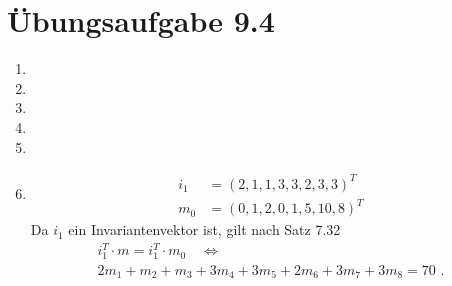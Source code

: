 \documentclass[a4paper]{scrartcl}
\newcommand{\gdw}{\Leftrightarrow}
\begin{document}
\section*{Übungsaufgabe 9.4} 
\begin{enumerate}
    \item

    \item

    \item

    \item

    \item

    \item
        \begin{align}
            i_1 &= \left( 2, 1, 1, 3, 3, 2, 3, 3 \right)^T \\
            m_0 &= \left( 0, 1, 2, 0, 1, 5, 10, 8 \right)^T
        \end{align}
        Da $i_1$ ein Invariantenvektor ist, gilt nach Satz 7.32
        \begin{equation}
            \begin{gathered}
                i_1^T \cdot m = i_1^T \cdot m_0 \quad \gdw \\
                2m_1 + m_2 + m_3 + 3m_4 + 3m_5 + 2m_6 + 3m_7 + 3m_8 = 70
                \text{ .}
            \end{gathered}
        \end{equation}
        


\end{enumerate}
\end{document}
